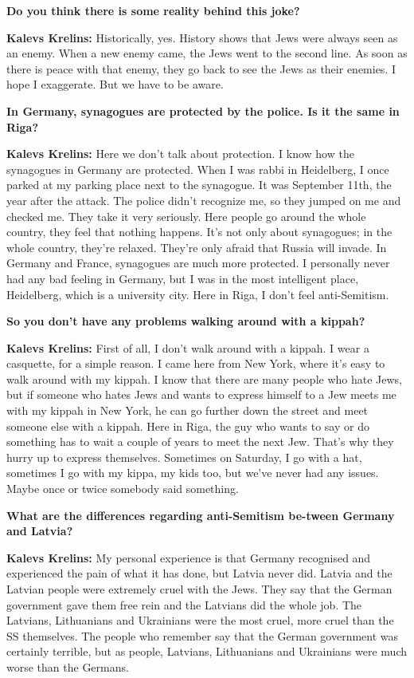 \textbf{Do you think there is some reality behind this joke?}  

\textbf{Kalevs Krelins:} Historically, yes. History shows that Jews were always seen as an enemy. When a new enemy came, the Jews went to the second line. As soon as there is peace with that enemy, they go back to see the Jews as their enemies. I hope I exaggerate. But we have to be aware. 

\textbf{In Germany, synagogues are protected by the police. Is it the same in Riga?} 

\textbf{Kalevs Krelins:} Here we don’t talk about protection. I know how the synagogues in Germany are protected. When I was rabbi in Heidelberg, I once parked at my parking place next to the synagogue. It was September 11th, the year after the attack. The police didn’t recognize me, so they jumped on me and checked me. They take it very seriously. Here people go around the whole country, they feel that nothing happens. It’s not only about synagogues; in the whole country, they're relaxed. They’re only afraid that Russia will invade. In Germany and France, synagogues are much more protected. I personally never had any bad feeling in Germany, but I was in the most intelligent place, Heidelberg, which is a university city. Here in Riga, I don’t feel anti-Semitism.  

\textbf{So you don’t have any problems walking around with a kippah?} 

\textbf{Kalevs Krelins:} First of all, I don't walk around with a kippah. I wear a casquette, for a simple reason. I came here from New York, where it’s easy to walk around with my kippah. I know that there are many people who hate Jews, but if someone who hates Jews and wants to express himself to a Jew meets me with my kippah in New York, he can go further down the street and meet someone else with a kippah. Here in Riga, the guy who wants to say or do something has to wait a couple of years to meet the next Jew. That’s why they hurry up to express themselves. Sometimes on Saturday, I go with a hat, sometimes I go with my kippa, my kids too, but we've never had any issues. Maybe once or twice somebody said something. 

\textbf{What are the differences regarding anti-Semitism be-tween Germany and Latvia?}  

\textbf{Kalevs Krelins:} My personal experience is that Germany recognised and experienced the pain of what it has done, but Latvia never did. Latvia and the Latvian people were extremely cruel with the Jews. They say that the German government gave them free rein and the Latvians did the whole job. The Latvians, Lithuanians and Ukrainians were the most cruel, more cruel than the SS themselves. The people who remember say that the German government was certainly terrible, but as people, Latvians, Lithuanians and Ukrainians were much worse than the Germans.  

